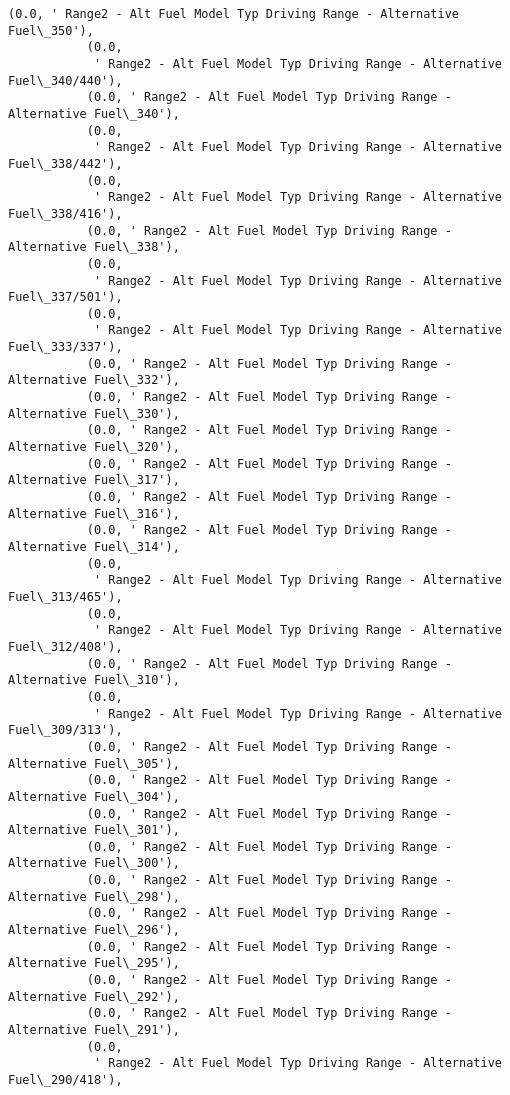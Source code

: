 \documentclass[11pt]{article}
\begin{document}
\begin{Verbatim}[commandchars=\\\{\}]
           (0.0, ' Range2 - Alt Fuel Model Typ Driving Range - Alternative Fuel\_350'),
           (0.0,
            ' Range2 - Alt Fuel Model Typ Driving Range - Alternative Fuel\_340/440'),
           (0.0, ' Range2 - Alt Fuel Model Typ Driving Range - Alternative Fuel\_340'),
           (0.0,
            ' Range2 - Alt Fuel Model Typ Driving Range - Alternative Fuel\_338/442'),
           (0.0,
            ' Range2 - Alt Fuel Model Typ Driving Range - Alternative Fuel\_338/416'),
           (0.0, ' Range2 - Alt Fuel Model Typ Driving Range - Alternative Fuel\_338'),
           (0.0,
            ' Range2 - Alt Fuel Model Typ Driving Range - Alternative Fuel\_337/501'),
           (0.0,
            ' Range2 - Alt Fuel Model Typ Driving Range - Alternative Fuel\_333/337'),
           (0.0, ' Range2 - Alt Fuel Model Typ Driving Range - Alternative Fuel\_332'),
           (0.0, ' Range2 - Alt Fuel Model Typ Driving Range - Alternative Fuel\_330'),
           (0.0, ' Range2 - Alt Fuel Model Typ Driving Range - Alternative Fuel\_320'),
           (0.0, ' Range2 - Alt Fuel Model Typ Driving Range - Alternative Fuel\_317'),
           (0.0, ' Range2 - Alt Fuel Model Typ Driving Range - Alternative Fuel\_316'),
           (0.0, ' Range2 - Alt Fuel Model Typ Driving Range - Alternative Fuel\_314'),
           (0.0,
            ' Range2 - Alt Fuel Model Typ Driving Range - Alternative Fuel\_313/465'),
           (0.0,
            ' Range2 - Alt Fuel Model Typ Driving Range - Alternative Fuel\_312/408'),
           (0.0, ' Range2 - Alt Fuel Model Typ Driving Range - Alternative Fuel\_310'),
           (0.0,
            ' Range2 - Alt Fuel Model Typ Driving Range - Alternative Fuel\_309/313'),
           (0.0, ' Range2 - Alt Fuel Model Typ Driving Range - Alternative Fuel\_305'),
           (0.0, ' Range2 - Alt Fuel Model Typ Driving Range - Alternative Fuel\_304'),
           (0.0, ' Range2 - Alt Fuel Model Typ Driving Range - Alternative Fuel\_301'),
           (0.0, ' Range2 - Alt Fuel Model Typ Driving Range - Alternative Fuel\_300'),
           (0.0, ' Range2 - Alt Fuel Model Typ Driving Range - Alternative Fuel\_298'),
           (0.0, ' Range2 - Alt Fuel Model Typ Driving Range - Alternative Fuel\_296'),
           (0.0, ' Range2 - Alt Fuel Model Typ Driving Range - Alternative Fuel\_295'),
           (0.0, ' Range2 - Alt Fuel Model Typ Driving Range - Alternative Fuel\_292'),
           (0.0, ' Range2 - Alt Fuel Model Typ Driving Range - Alternative Fuel\_291'),
           (0.0,
            ' Range2 - Alt Fuel Model Typ Driving Range - Alternative Fuel\_290/418'),

\end{Verbatim}
\end{document}

